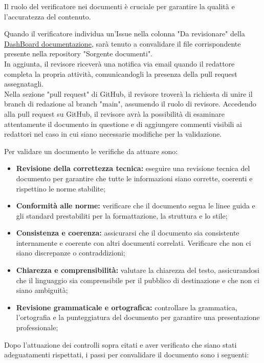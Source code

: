 Il ruolo del verificatore nei documenti è cruciale per garantire la qualità e l'accuratezza del contenuto.

Quando il verificatore individua un'Issue nella colonna "Da revisionare" della \href{https://github.com/orgs/ByteOps-swe/projects/1/views/1}{DashBoard documentazione}, sarà tenuto a convalidare il file corrispondente presente nella repository "Sorgente documenti". \\
In aggiunta, il revisore riceverà una notifica via email quando il redattore completa la propria attività, comunicandogli la presenza della pull request assegnatagli.\\
Nella sezione "pull request" di GitHub, il revisore troverà la richiesta di unire il branch di redazione al branch "main", assumendo il ruolo di revisore. Accedendo alla pull request su GitHub, il revisore avrà la possibilità di esaminare attentamente il documento in questione e di aggiungere commenti visibili ai redattori nel caso in cui siano necessarie modifiche per la validazione.

\vspace{0.3cm}

Per validare un documento le verifiche da attuare sono:
\begin{itemize}
    \item \textbf{Revisione della correttezza tecnica:} 
        eseguire una revisione tecnica del documento per garantire che tutte le informazioni siano corrette, coerenti e rispettino le norme stabilite;
    \item \textbf{Conformità alle norme:} 
        verificare che il documento segua le linee guida e gli standard prestabiliti per la formattazione, la struttura e lo stile;
    \item \textbf{Consistenza e coerenza:} 
        assicurarsi che il documento sia consistente internamente e coerente con altri documenti correlati. Verificare che non ci siano discrepanze o contraddizioni;
    \item \textbf{Chiarezza e comprensibilità:} 
        valutare la chiarezza del testo, assicurandosi che il linguaggio sia comprensibile per il pubblico di destinazione e che non ci siano ambiguità;
    \item \textbf{Revisione grammaticale e ortografica:} 
        controllare la grammatica, l'ortografia e la punteggiatura del documento per garantire una presentazione professionale;
\end{itemize}

Dopo l'attuazione dei controlli sopra citati e aver verificato che siano stati adeguatamenti rispettati, i passi per convalidare il documento sono i seguenti:


